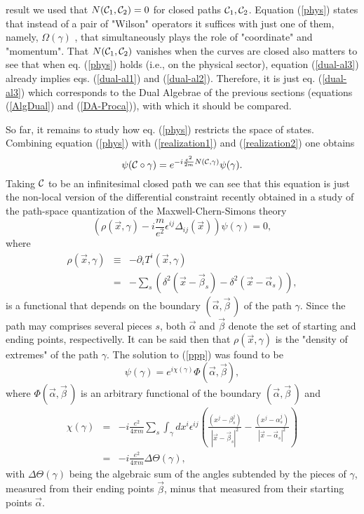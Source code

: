 \documentclass[a4paper,12pt]{article}
\newcommand{\eref}[1]{(\ref{#1})}
\begin{document}
result we used that $N({\cal C}_1 , {\cal C}_2)= 0$ for closed
paths ${\cal C}_1 , {\cal C}_2$. Equation \eref{phys} states that
instead of a pair of "Wilson" operators it suffices with just one
of them, namely, $\Omega(\gamma)$ , that simultaneously plays the
role of "coordinate" and "momentum". That $N({\cal C}_1 , {\cal
C}_2)$ vanishes when the curves are closed also matters to see
that when eq. \eref{phys} holds (i.e., on the physical sector),
equation \eref{dual-al3} already implies eqs. \eref{dual-al1} and
\eref{dual-al2}. Therefore, it is just eq. \eref{dual-al3} which
corresponds to the Dual Algebrae of the previous sections
(equations \eref{AlgDual} and  \eref{DA-Proca}), with which it
should be compared.

So far, it remains to study how eq. \eref{phys} restricts the
space of states. Combining equation \eref{phys} with
\eref{realization1} and \eref{realization2} one obtains
\begin{equation}
\psi({\cal C}\circ\gamma)=e^{-i\frac{e^2}{2m}N({\cal C},\gamma)}
\psi(\gamma)\label{vin-int}.
\end{equation}
Taking ${\cal C}$ to be an infinitesimal closed path we can see
that this equation is just the non-local version of the
differential constraint recently obtained in a study of the
path-space quantization of the Maxwell-Chern-Simons theory
\cite{LO}
\begin{equation}
\left(\rho(\vec x,\gamma)-i\frac m
{e^2}\epsilon^{ij}\Delta_{ij}(\vec x) \right)\psi(\gamma)=0,
\label{ppp}
\end{equation}
where
\begin{eqnarray}
  \rho(\vec x,\gamma) & \equiv & -\partial_i T^i(\vec
  x,\gamma)\nonumber\\
  &=& -\sum_s (\delta^2(\vec x - \vec {\beta}_s) -\delta^2(\vec x - \vec
  {\alpha}_s)),\label{ro}
\end{eqnarray}
is a functional that depends on the boundary
$(\vec\alpha,\vec\beta\,)$ of the path $\gamma$. Since the path
may comprises several pieces $s$, both $\vec\alpha$ and
$\vec\beta$ denote the set of starting and ending points,
respectivelly. It can be said then that  $\rho(\vec x,\gamma)$ is
the "density of extremes" of the path $\gamma$. The solution to
\eref{ppp} was found to be\cite{LO}
\begin{equation}
\psi(\gamma)=e^{i\chi(\gamma)}\Phi(\vec\alpha,\vec\beta),\label{oswaldo}
\end{equation}
where $\Phi(\vec\alpha,\vec\beta\,)$ is an arbitrary functional of
the boundary $(\vec\alpha,\vec\beta\,)$ and
\begin{eqnarray}
\chi(\gamma)&=&-i\frac{e^2}{4\pi m}\sum_s\int_\gamma
dx^i\epsilon^{ij}\left(\frac{(x^j-\beta^j_s)}{|\vec
x-\vec\beta_s|^2}
-\frac{(x^j-\alpha^j_s)}{|\vec x-\vec\alpha_s|^2}\right)\nonumber\\
&=&-i\frac{e^2}{4\pi m}\Delta\Theta(\gamma),\label{chi}
\end{eqnarray}
with $\Delta\Theta(\gamma)$ being the algebraic sum of the angles
subtended by the pieces of $\gamma$, measured from their ending
points $\vec\beta$, minus that measured from their starting points
$\vec\alpha$.
\end{document}
